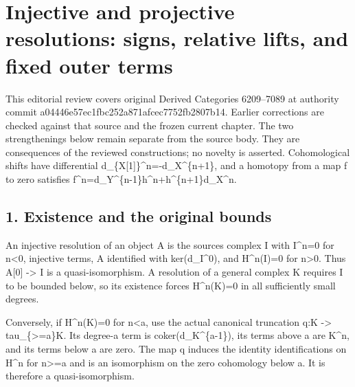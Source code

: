 \section{\texorpdfstring{Injective and projective resolutions:\allowbreak{} signs,\allowbreak{} relative lifts,\allowbreak{} and fixed outer terms}{Injective and projective   relative  and fixed outer terms}}\label{proofs-6209-7089-injective-and-projective-resolutions-signs-relative-lifts-and-fixed-outer-terms}

This editorial review covers original Derived Categories 6209–\allowbreak{}7089 at authority commit a04446e5\allowbreak{}7ec1fbc2\allowbreak{}52a871af\allowbreak{}cec7752f\allowbreak{}b2807b14. Earlier corrections are checked against that source and the frozen current chapter. The two strengthenings below remain separate from the source body. They are consequences of the reviewed constructions; no novelty is asserted. Cohomological shifts have differential d\_\allowbreak{}\{X[1]\allowbreak{}\}\textasciicircum{}n\allowbreak{}=-d\_\allowbreak{}X\textasciicircum{}\{n\allowbreak{}+1\},\allowbreak{} and a homotopy from a map f to zero satisfies f\textasciicircum{}n\allowbreak{}=d\_\allowbreak{}Y\textasciicircum{}\{n-1\}h\textasciicircum{}n\allowbreak{}+h\textasciicircum{}\{n\allowbreak{}+1\}d\_\allowbreak{}X\textasciicircum{}n.

\subsection{1. Existence and the original bounds}\label{proofs-6209-7089-existence-and-the-original-bounds}

An injective resolution of an object A is the source\textquotesingle s complex I with I\textasciicircum{}n\allowbreak{}=0 for n<0,\allowbreak{} injective terms,\allowbreak{} A identified with ker(d\_\allowbreak{}I\textasciicircum{}0)\allowbreak{},\allowbreak{} and H\textasciicircum{}n(I)\allowbreak{}\allowbreak{}=0 for n\textgreater0. Thus A[0]\allowbreak{} \allowbreak{}-> I is a quasi-isomorphism. A resolution of a general complex K requires I to be bounded below,\allowbreak{} so its existence forces H\textasciicircum{}n(K)\allowbreak{}\allowbreak{}=0 in all sufficiently small degrees.

Conversely,\allowbreak{} if H\textasciicircum{}n(K)\allowbreak{}\allowbreak{}=0 for n<a,\allowbreak{} use the actual canonical truncation q:\allowbreak{}K \allowbreak{}-> tau\_\allowbreak{}\{>\allowbreak{}=a\}K. Its degree-a term is coker(d\_\allowbreak{}K\textasciicircum{}\{a-1\})\allowbreak{},\allowbreak{} its terms above a are K\textasciicircum{}n,\allowbreak{} and its terms below a are zero. The map q induces the identity identifications on H\^{}n for n>\allowbreak{}=a and is an isomorphism on the zero cohomology below a. It is therefore a quasi-isomorphism.

